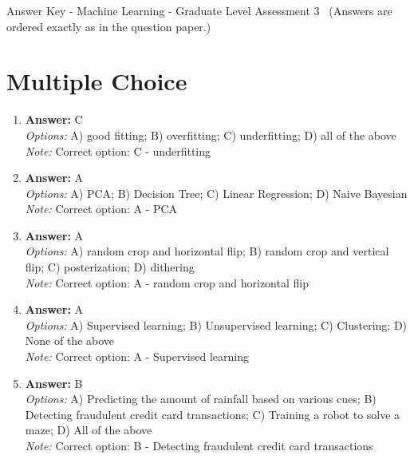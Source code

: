 \documentclass[12pt]{article}
\begin{document}
\begin{center}
Answer Key - Machine Learning - Graduate Level Assessment 3 \
\small (Answers are ordered exactly as in the question paper.)
\end{center}

\section*{Multiple Choice}
\begin{enumerate}[label=\arabic*.]
\item \textbf{Answer:} C
\\ \textit{Options:} A) good fitting; B) overfitting; C) underfitting; D) all of the above
\\ \textit{Note:} Correct option: C - underfitting
\item \textbf{Answer:} A
\\ \textit{Options:} A) PCA; B) Decision Tree; C) Linear Regression; D) Naive Bayesian
\\ \textit{Note:} Correct option: A - PCA
\item \textbf{Answer:} A
\\ \textit{Options:} A) random crop and horizontal flip; B) random crop and vertical flip; C) posterization; D) dithering
\\ \textit{Note:} Correct option: A - random crop and horizontal flip
\item \textbf{Answer:} A
\\ \textit{Options:} A) Supervised learning; B) Unsupervised learning; C) Clustering; D) None of the above
\\ \textit{Note:} Correct option: A - Supervised learning
\item \textbf{Answer:} B
\\ \textit{Options:} A) Predicting the amount of rainfall based on various cues; B) Detecting fraudulent credit card transactions; C) Training a robot to solve a maze; D) All of the above
\\ \textit{Note:} Correct option: B - Detecting fraudulent credit card transactions
\end{enumerate}
\end{document}
